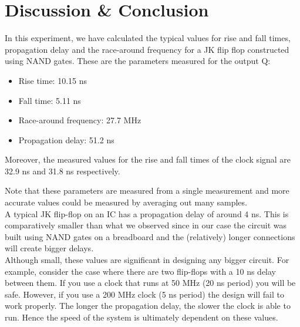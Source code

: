 \section{Discussion \& Conclusion}

In this experiment, we have calculated the typical values for rise and fall times, propagation delay and the race-around frequency for a JK flip flop constructed using NAND gates. These are the parameters measured for the output Q:\\

\begin{itemize}
    \item Rise time: 10.15 ns
    \item Fall time: 5.11 ns
    \item Race-around frequency: 27.7 MHz
    \item Propagation delay: 51.2 ns\\
\end{itemize}

Moreover, the measured values for the rise and fall times of the clock signal are 32.9 ns and 31.8 ns respectively.

Note that these parameters are measured from a single measurement and more accurate values could be measured by averaging out many samples.\\

A typical JK flip-flop on an IC has a propagation delay of around 4 ns. This is comparatively smaller than what we observed since in our case the circuit was built using NAND gates on a breadboard and the (relatively) longer connections will create bigger delays.\\

Although small, these values are significant in designing any bigger circuit. For example, consider the case where there are two flip-flops with a 10 ns delay between them. If you use a clock that runs at 50 MHz (20 ns period) you will be safe. However, if you use a 200 MHz clock (5 ns period) the design will fail to work properly. The longer the propagation delay, the slower the clock is able to run. Hence the speed of the system is ultimately dependent on these values.
